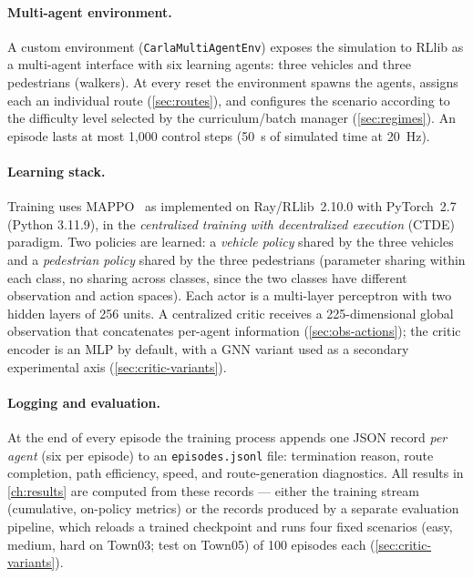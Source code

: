 \paragraph{Multi-agent environment.}
A custom environment (\texttt{CarlaMultiAgentEnv}) exposes the simulation
to RLlib as a multi-agent interface with six learning agents: three
vehicles and three pedestrians (walkers). At every reset the environment
spawns the agents, assigns each an individual route (\cref{sec:routes}),
and configures the scenario according to the difficulty level selected by
the curriculum/batch manager (\cref{sec:regimes}). An episode lasts at most
1{,}000 control steps (\SI{50}{s} of simulated time at \SI{20}{Hz}).

\paragraph{Learning stack.}
Training uses MAPPO~\cite{yu2022surprising} as implemented on
Ray/RLlib~2.10.0 with PyTorch~2.7 (Python 3.11.9), in the
\emph{centralized training with decentralized execution} (CTDE) paradigm.
Two policies are learned: a \emph{vehicle policy} shared by the three
vehicles and a \emph{pedestrian policy} shared by the three pedestrians
(parameter sharing within each class, no sharing across classes, since the
two classes have different observation and action spaces). Each actor is a
multi-layer perceptron with two hidden layers of 256 units. A centralized
critic receives a 225-dimensional global observation that concatenates
per-agent information (\cref{sec:obs-actions}); the critic encoder is an
MLP by default, with a GNN variant used as a secondary experimental axis
(\cref{sec:critic-variants}).

\paragraph{Logging and evaluation.}
At the end of every episode the training process appends one JSON record
\emph{per agent} (six per episode) to an \texttt{episodes.jsonl} file:
termination reason, route completion, path efficiency, speed, and
route-generation diagnostics. All results in \cref{ch:results} are computed
from these records --- either the training stream (cumulative, on-policy
metrics) or the records produced by a separate evaluation pipeline, which
reloads a trained checkpoint and runs four fixed scenarios (easy, medium,
hard on Town03; test on Town05) of 100 episodes each
(\cref{sec:critic-variants}).

